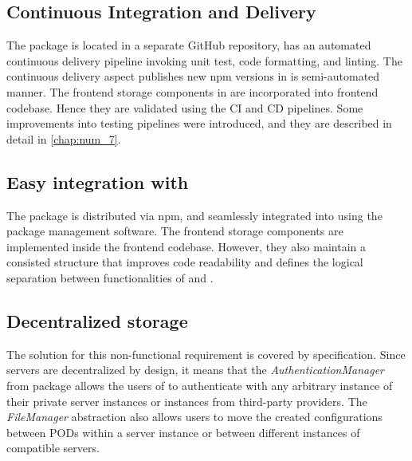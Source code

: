 \subsection{Continuous Integration and Delivery}

The \lpas{} package is located in a separate GitHub repository, has an automated continuous delivery pipeline invoking unit test, code formatting, and linting. The continuous delivery aspect publishes new npm versions in is semi-automated manner. The frontend storage components in \lpa{} are incorporated into frontend codebase. Hence they are validated using the \lpa{} CI and CD pipelines. Some improvements into \lpa{} testing pipelines were introduced, and they are described in detail in \autoref{chap:num_7}.

\subsection{Easy integration with \lpa{}}

The \lpas{} package is distributed via npm, and seamlessly integrated into \lpa{} using the package management software. The frontend storage components are implemented inside the frontend codebase. However, they also maintain a consisted structure that improves code readability and defines the logical separation between functionalities of \lpa{} and \lpas{}.

\subsection{Decentralized storage}

The solution for this non-functional requirement is covered by \solid{} specification. Since \solid{} servers are decentralized by design, it means that the \textit{AuthenticationManager} from \lpas{} package allows the users of \lpa{} to authenticate with any arbitrary instance of their private \solid{} server instances or instances from third-party \solid{} providers. The \textit{FileManager} abstraction also allows users to move the created \lpa{} configurations between \solid{} PODs within a \solid{} server instance or between different instances of compatible \solid{} servers.